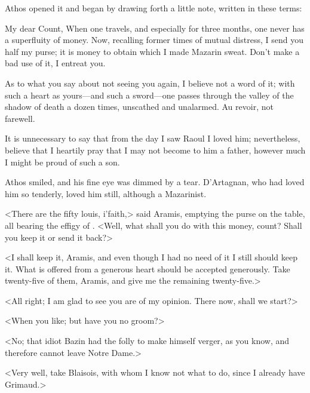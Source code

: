 Athos opened it and began by drawing forth a little note, written in these terms:

\begin{a4}
	\vspace{-1.5em}
\end{a4}

\begin{mail}{}{My dear Count,}
When one travels, and especially for three months, one never has a superfluity of money. Now, recalling former times of mutual distress, I send you half my purse; it is money to obtain which I made Mazarin sweat. Don't make a bad use of it, I entreat you.

As to what you say about not seeing you again, I believe not a word of it; with such a heart as yours—and such a sword—one passes through the valley of the shadow of death a dozen times, unscathed and unalarmed. Au revoir, not farewell.

It is unnecessary to say that from the day I saw Raoul I loved him; nevertheless, believe that I heartily pray that I may not become to him a father, however much I might be proud of such a son.



\end{mail}

Athos smiled, and his fine eye was dimmed by a tear. D'Artagnan, who had loved him so tenderly, loved him still, although a Mazarinist.

<There are the fifty louis, i'faith,> said Aramis, emptying the purse on the table, all bearing the effigy of . <Well, what shall you do with this money, count? Shall you keep it or send it back?>

<I shall keep it, Aramis, and even though I had no need of it I still should keep it. What is offered from a generous heart should be accepted generously. Take twenty-five of them, Aramis, and give me the remaining twenty-five.>

<All right; I am glad to see you are of my opinion. There now, shall we start?>

<When you like; but have you no groom?>

<No; that idiot Bazin had the folly to make himself verger, as you know, and therefore cannot leave Notre Dame.>

<Very well, take Blaisois, with whom I know not what to do, since I already have Grimaud.>

